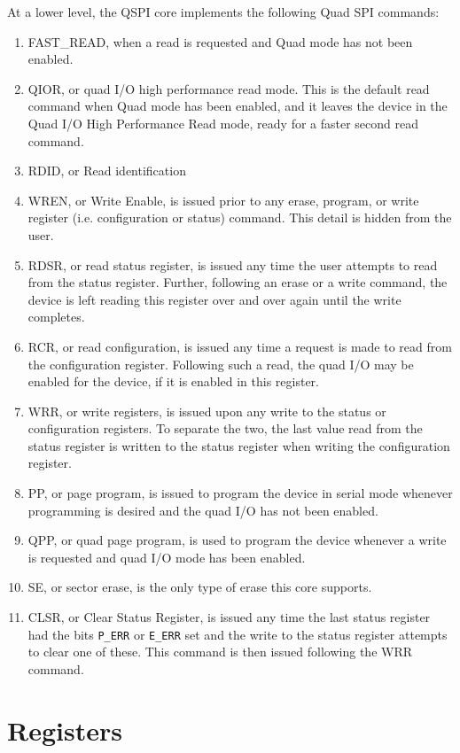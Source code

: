 \documentclass{gqtekspec}
\begin{document}
At a lower level, the QSPI core implements the following Quad SPI commands:
\begin{enumerate}
\item FAST\_READ, when a read is requested and Quad mode has not been enabled.
\item QIOR, or quad I/O high performance read mode.  This is the default read
	command when Quad mode has been enabled, and it leaves the device
	in the Quad I/O High Performance Read mode, ready for a faster second
	read command.
\item RDID, or Read identification
\item WREN, or Write Enable, is issued prior to any erase, program, or
		write register (i.e. configuration or status) command.
	This detail is hidden from the user.
\item RDSR, or read status register, is issued any time the user attempts
	to read from the status register.  Further, following an erase or a
	write command, the device is left reading this register over and over
	again until the write completes.
\item RCR, or read configuration, is issued any time a request is made to
	read from the configuration register.  Following such a read, the
	quad I/O may be enabled for the device, if it is enabled in this
	register.
\item WRR, or write registers, is issued upon any write to the status or
	configuration registers.  To separate the two, the last value read
	from the status register is written to the status register when 
	writing the configuration register.
\item PP, or page program, is issued to program the device in serial mode
	whenever programming is desired and the quad I/O has not been enabled.
\item QPP, or quad page program, is used to program the device whenever
	a write is requested and quad I/O mode has been enabled.
\item SE, or sector erase, is the only type of erase this core supports.
\item CLSR, or Clear Status Register, is issued any time the last status
	register had the bits {\tt P\_ERR} or {\tt E\_ERR} set and the
	write to the status register attempts to clear one of these.  This
	command is then issued following the WRR command.
\end{enumerate}

\chapter{Registers}\label{chap:regs}
\end{document}
